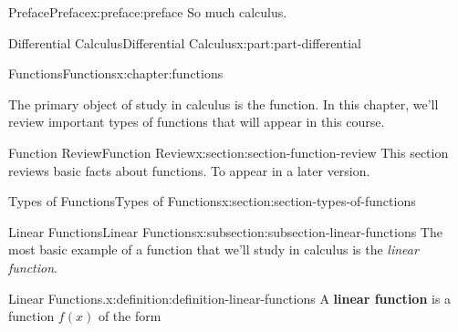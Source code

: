 \documentclass[twoside,10pt,]{tufte-book}
\newcommand{\terminology}[1]{\textbf{#1}}
\numberwithin{equation}{part}
\begin{document}
\typeout{************************************************}
%
\begin{preface}{Preface}{}{Preface}{}{}{x:preface:preface}
So much calculus.%
\end{preface}
\setcounter{tocdepth}{1}
\renewcommand*\contentsname{Contents}
\tableofcontents
\mainmatter
%
%
\typeout{************************************************}
\typeout{************************************************}
%
\begin{partptx}{Differential Calculus}{}{Differential Calculus}{}{}{x:part:part-differential}
%
\typeout{************************************************}
\typeout{************************************************}
%
\begin{chapterptx}{Functions}{}{Functions}{}{}{x:chapter:functions}
\begin{introduction}{}%
The primary object of study in calculus is the function. In this chapter, we'll review important types of functions that will appear in this course.%
\end{introduction}%
%
%
\typeout{************************************************}
\typeout{************************************************}
%
\begin{sectionptx}{Function Review}{}{Function Review}{}{}{x:section:section-function-review}
This section reviews basic facts about functions. To appear in a later version.%
\end{sectionptx}
%
%
\typeout{************************************************}
\typeout{************************************************}
%
\begin{sectionptx}{Types of Functions}{}{Types of Functions}{}{}{x:section:section-types-of-functions}
%
%
\typeout{************************************************}
\typeout{************************************************}
%
\begin{subsectionptx}{Linear Functions}{}{Linear Functions}{}{}{x:subsection:subsection-linear-functions}
The most basic example of a function that we'll study in calculus is the \emph{linear function}.%
\begin{definition}{Linear Functions.}{x:definition:definition-linear-functions}%
%
A \terminology{linear function} is a function \(f(x)\) of the form%

\end{definition}
\end{subsectionptx}
\end{sectionptx}
\end{chapterptx}
\end{partptx}
\end{document}
